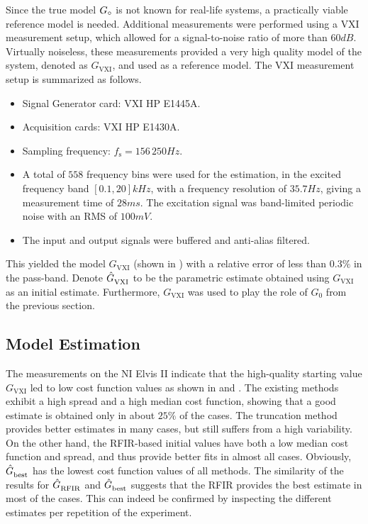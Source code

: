Since the true model ${G}_{\circ}$ is not known for real-life systems, a practically viable reference model is needed.
Additional measurements were performed using a \gls{VXI} measurement setup, which allowed for a signal-to-noise ratio of more than $60\unit{dB}$. 
Virtually noiseless, these measurements provided a very high quality model of the system, denoted as $G_\mathrm{VXI}$, and used as a reference model. 
The \gls{VXI} measurement setup is summarized as follows.
\begin{itemize}
  \item Signal Generator card: \gls{VXI} HP E1445A.
  \item Acquisition cards: \gls{VXI} HP E1430A.
  \item Sampling frequency: $f_\mathrm{s} = 156\,250 \unit{Hz}$.
  \item A total of $558$ frequency bins were used for the estimation, in the excited frequency band $[0.1,20] \unit{kHz}$, with a frequency resolution of $35.7\unit{Hz}$, giving a measurement time of $28\unit{ms}$. The excitation signal was band-limited periodic noise with an \gls{RMS} of $100\unit{mV}$.
  \item The input and output signals were buffered and anti-alias filtered.
\end{itemize}
This yielded the model $G_\mathrm{VXI}$ (shown in ) with a relative error  of less than $0.3\%$ in the pass-band.  Denote $\hat{G}_{\mathrm{VXI}}^{\mathrm{}}$ to be the parametric estimate obtained using $G_{\mathrm{VXI}}$ as an initial estimate. Furthermore, $G_\mathrm{VXI}$ was used to play the role of $G_0$ from the previous section.

\subsection{Model Estimation}
  The measurements on the NI Elvis II indicate that the high-quality starting value $G_{\mathrm{VXI}}$ led to low cost function values as shown in  and .
  The existing methods exhibit a high spread and a high median cost function, showing that a good estimate is obtained only in about $25\%$ of the cases.
  The truncation method provides better estimates in many cases, but still suffers from a high variability.
  On the other hand, the \gls{RFIR}-based initial values have both a low median cost function and spread, and thus provide better fits in almost all cases.
  Obviously, $\hat{G}_{\mathrm{best}}^{\mathrm{}}$ has the lowest cost function values of all methods.
  The similarity of the results for $\hat{G}_{\mathrm{RFIR}}^{\mathrm{}}$ and $\hat{G}_{\mathrm{best}}^{\mathrm{}}$ suggests that the \gls{RFIR} provides the best estimate in most of the cases.
  This can indeed be confirmed by inspecting the different estimates per repetition of the experiment.

